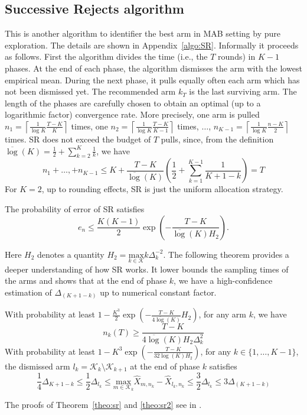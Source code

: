\subsection*{Successive Rejects algorithm}
This is another algorithm to identifier the best arm in MAB setting by pure exploration. The details are shown in Appendix~\ref{algo:SR}. Informally it proceeds as follows. First the algorithm divides the time (i.e., the $T$ rounds) in $K-1$ phases. At the end of each phase, the algorithm dismisses the arm with the lowest empirical mean. During the next phase, it pulls equally often each arm which has not been dismissed yet. The recommended
arm $k_T$ is the last surviving arm. The length of the phases are carefully chosen to obtain an optimal (up to a logarithmic factor) convergence rate. 
More precisely, one arm is pulled $n_1 = \left\lceil\frac{1}{\log{K}} \frac{T-K}{K}\right\rceil$ times, 
one $n_2 = \left\lceil \frac{1}{\log{K}} \frac{T-K}{K-1}\right\rceil$ times, $\dots$, $n_{K-1} = \left\lceil \frac{1}{\log{K}}\frac{n-K}{2}\right\rceil$ times. 
SR does not exceed the budget of $T$ pulls, since, from the definition $\overline{\log}(K) = \frac{1}{2} +\sum_{k=2}^{K} \frac{1}{k}$, we have
\[n_1+\dots, + n_{K-1} \leqslant K+\frac{T-K}{\overline{\log}(K)}\left(\frac{1}{2}+\sum_{k=1}^{K-1}\frac{1}{K+1-k}\right) = T\]
For $K=2$, up to rounding effects, SR is just the uniform allocation strategy.
\begin{theo}
\label{theo:sr}
The probability of error of SR satisfies
\[e_n \leqslant \frac{K(K-1)}{2}\exp{\left(-\frac{T-K}{\overline{\log}(K)H_2}\right)}.\]
\end{theo}
Here $H_2$ denotes a quantity $H_2 = \underset{k\in\mathscr{K}}{\text{max}} k\Delta_k^{-2}$. The following theorem provides a deeper understanding of how SR works. It lower bounds the sampling times of the arms and shows that at the end of phase $k$, we have a high-confidence estimation of $\Delta_{(K+1-k)}$ up to numerical constant factor. 

\begin{theo}
\label{theo:sr2}
With probability at least $1-\frac{K^3}{2}\exp{\left( - \frac{T-K}{4\overline{\log}(K)}H_2\right)}$, for any arm $k$, we have 
\begin{equation}
\label{equa:sr1}
n_k(T) \geqslant \frac{T-K}{4\overline{\log}(K)H_2\Delta_k^2}
\end{equation}
With probability at least $1-K^3\exp{\left(-\frac{T-K}{32\log{(K)}H_2}\right)}$, for any $k\in\{1,\dots,K-1\}$, the dismissed arm $l_k = \mathscr{K}_{k}\setminus \mathscr{K}_{k+1}$ at the end of phase $k$ satisfies
\begin{equation}
\label{equa:sr2}
\frac{1}{4}\Delta_{K+1-k}\leqslant \frac{1}{2}\Delta_{l_k}\leqslant \underset{m\in \mathscr{K}_k}{\text{max}} \hat{X}_{m,n_k} - \hat{X}_{l_k,n_k} \leqslant \frac{3}{2}\Delta_{l_k}\leqslant 3\Delta_{(K+1-k)}
\end{equation}
\end{theo}
The proofs of Theorem~\ref{theo:sr} and \ref{theo:sr2} see in \cite{audibert2010best}.